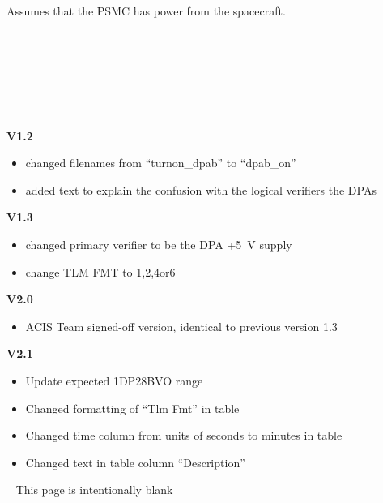\documentclass[11pt]{article}
\begin{document}
\vspace{0.15in}
\normalsize
{} \\
\normalsize
Assumes that the PSMC has power from the spacecraft. \\


\normalsize
{} \\
\normalsize


\normalsize
{} \\
\normalsize



\vspace{0.15in}
\normalsize
{} \\
\normalsize

\normalsize
{} \\
\normalsize

{\bf V1.2}
\begin{itemize}
\item changed filenames from ``turnon\_dpab'' to
``dpab\_on''
\item added text to explain the confusion with the logical verifiers
the DPAs
\end{itemize}

{\bf V1.3}
\begin{itemize}
\item changed primary verifier to be the DPA +5~V supply
\item change TLM FMT to 1,2,4or6
\end{itemize}

{\bf V2.0}
\begin{itemize}
\item ACIS Team signed-off version, identical to previous version 1.3
\end{itemize}

{\bf V2.1}
\begin{itemize}
\item Update expected 1DP28BVO range
\item Changed formatting of ``Tlm Fmt'' in table
\item Changed time column from units of seconds to minutes in table
\item Changed text in table column ``Description''
\end{itemize}

\newpage\
\vspace{0.4\textheight}
\bc This page is intentionally blank \ec

\newcommand{\tablecaptiontext}{TURN ON DPA B (realtime version)}

\end{document}

